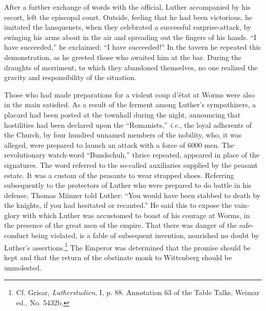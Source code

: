 After a further exchange of words with the official, Luther accompanied
by his escort, left the episcopal court. Outside, feeling
that he had been victorious, he imitated the lansquenets, when they
celebrated a successful surprise-attack, by swinging his arms about
in the air and spreading out the fingers of his hands. “I have succeeded,”
he exclaimed; “I have succeeded!” In the tavern he repeated this demonstration,
as he greeted those who awaited him at
the bar. During the draughts of merriment, to which they abandoned
themselves, no one realized the gravity and responsibility of the
situation.

Those who had made preparations for a violent coup d’état at
Worms were also in the main satisfied. As a result of the ferment
among Luther’s sympathizers, a placard had been posted at the townhall
during the night, announcing that hostilities had been declared
upon the “Romanists,” \textit{i.e.}, the loyal adherents of the Church, by
four hundred unnamed members of the nobility, who, it was alleged,
were prepared to launch an attack with a force of 6000 men. The
revolutionary watch-word “Bundschuh,” thrice repeated, appeared
in place of the signatures. The word referred to the so-called auxiliaries
supplied by the peasant estate. It was a custom of the peasants to
wear strapped shoes. Referring subsequently to the protectors of
Luther who were prepared to do battle in his defense, Thomas Miinzer
told Luther: “You would have been stabbed to death by the
knights, if you had hesitated or recanted.” He said this to
expose the vain-glory with which Luther was accustomed to boast of
his courage at Worms, in the presence of the great men
of the empire.
That there was danger of the safe-conduct being violated, is a fable
of subsequent invention, nourished no doubt by Luther’s assertions.\footnote
{Cf. Grisar, \textit{Lutherstudien}, I, p. 88. Annotation 63 of the Table Talks, Weimar ed., No.
5432b.}
The Emperor was determined that the promise should be kept and
that the return of the obstinate monk to Wittenberg should be
unmolested.

